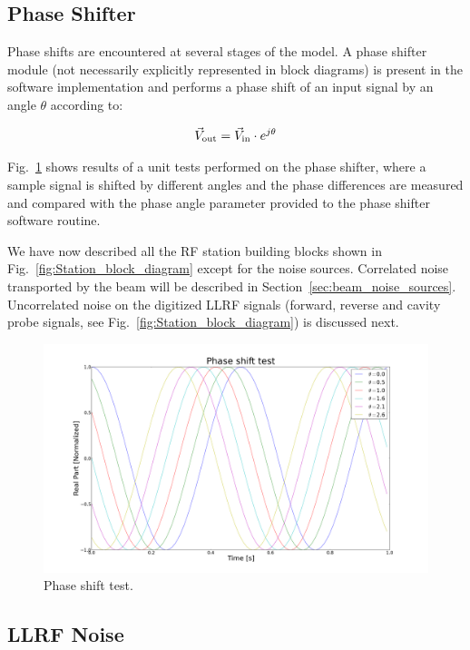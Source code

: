 \documentclass[a4paper,12pt]{article}
\begin{document}
\subsection{Phase Shifter}

Phase shifts are encountered at several stages of the model. A phase shifter module (not necessarily explicitly represented in block diagrams) is present in the software implementation and performs a phase shift of an input signal by an angle $\theta$ according to:

\begin{equation}
  \vec V_{\rm out} = \vec V_{\rm in} \cdot e^{j\theta}
\end{equation}

Fig.~\ref{fig:phase_shfiter_test} shows results of a unit tests performed on the phase shifter, where a sample signal is shifted by different angles and the phase differences are measured and compared with the phase angle parameter provided to the phase shifter software routine.

We have now described all the RF station building blocks shown in Fig.~\ref{fig:Station_block_diagram} except for the noise sources. Correlated noise transported by the beam will be described in Section~\ref{sec:beam_noise_sources}. Uncorrelated noise on the digitized LLRF signals (forward, reverse and cavity probe signals, see Fig.~\ref{fig:Station_block_diagram}) is discussed next.

\begin{figure}
\centering
\includegraphics[scale=0.265]{../figures/phase_shift_test.png}
\caption{Phase shift test.}
\label{fig:phase_shfiter_test}
\end{figure}

\subsection{LLRF Noise}
\label{sec:llrf_noise}
\end{document}

